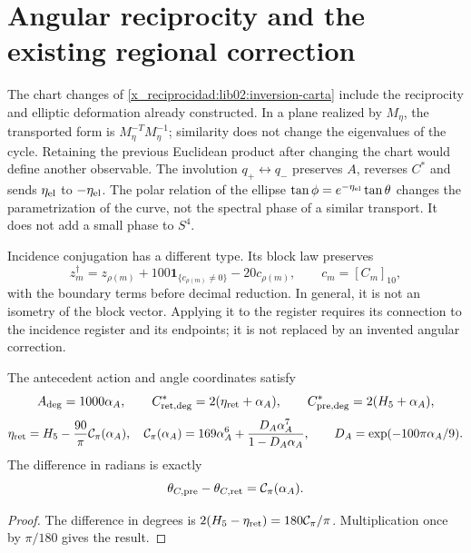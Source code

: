 \section{Angular reciprocity and the existing regional correction}
\label{x_reciprocidad:lib02:correccion-regional}

The chart changes of \cref{x_reciprocidad:lib02:inversion-carta} include the
reciprocity and elliptic deformation already constructed. In a plane
realized by \(M_\eta\), the transported form is
\(M_\eta^{-T}M_\eta^{-1}\); similarity does not change the
eigenvalues of the cycle. Retaining the previous Euclidean product after
changing the chart would define another observable. The involution
\(q_+\leftrightarrow q_-\) preserves \(A\), reverses \(C^*\)
and sends \(\eta_{\rm el}\) to \(-\eta_{\rm el}\). The polar
relation of the ellipse
\(\tan\phi=e^{-\eta_{\rm el}}\tan\theta\) changes the
parametrization of the curve, not the spectral phase of a similar
transport. It does not add a small phase to \(S^4\).

Incidence conjugation has a different type. Its block law preserves
\[
 z_m^\dagger=z_{\rho(m)}
 +100\mathbf1_{\{c_{\rho(m)}\ne0\}}-20c_{\rho(m)},
 \qquad c_m=[C_m]_{10},
\]
with the boundary terms before decimal reduction. In general, it is not an isometry of the block vector. Applying it to the register requires its connection to the incidence register and its endpoints; it is not replaced by an invented angular correction.

\begin{proposition}
\label{x_reciprocidad:lib02:retorno-regional}
The antecedent action and angle coordinates satisfy
\[
 A_{\rm deg}=1000\alpha_A,\qquad
 C^*_{\rm ret,deg}=2(\eta_{\rm ret}+\alpha_A),\qquad
 C^*_{\rm pre,deg}=2(H_5+\alpha_A),
\]
\[
 \eta_{\rm ret}=H_5-\frac{90}{\pi}\mathcal C_\pi(\alpha_A),
 \quad
 \mathcal C_\pi(\alpha_A)=169\alpha_A^6+
 \frac{D_A\alpha_A^7}{1-D_A\alpha_A},\qquad
 D_A=\exp(-100\pi\alpha_A/9).
\]
The difference in radians is exactly
\[
 \theta_{C,\rm pre}-\theta_{C,\rm ret}=\mathcal C_\pi(\alpha_A).
\]
\end{proposition}
\begin{proof}
The difference in degrees is \(2(H_5-\eta_{\rm ret})=180\mathcal C_\pi/\pi\). Multiplication once by \(\pi/180\) gives the result.
\end{proof}

